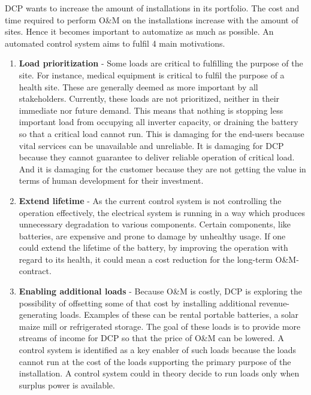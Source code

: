 DCP wants to increase the amount of installations in its portfolio. The cost and time required to perform O\&M on the installations increase with the amount of sites. Hence it becomes important to automatize as much as possible. An automated control system aims to fulfil 4 main motivations.\\

\begin{enumerate}
    \item \textbf{Load prioritization}  -    Some loads are critical to fulfilling the purpose of the site. For instance, medical equipment is critical to fulfil the purpose of a health site. These are generally deemed as more important by all stakeholders. Currently, these loads are not prioritized, neither in their immediate nor future demand. This means that nothing is stopping less important load from occupying all inverter capacity, or draining the battery so that a critical load cannot run. This is damaging for the end-users because vital services can be unavailable and unreliable. It is damaging for DCP because they cannot guarantee to deliver reliable operation of critical load. And it is damaging for the customer because they are not getting the value in terms of human development for their investment.
    \item \textbf{Extend lifetime}  -   As the current control system is not controlling the operation effectively, the electrical system is running in a way which produces unnecessary degradation to various components. Certain components, like batteries, are expensive and prone to damage by unhealthy usage. If one could extend the lifetime of the battery, by improving the operation with regard to its health, it could mean a cost reduction for the long-term O\&M-contract.
    \item \textbf{Enabling additional loads}    -   Because O\&M is costly, DCP is exploring the possibility of offsetting some of that cost by installing additional revenue-generating loads. Examples of these can be rental portable batteries, a solar maize mill or refrigerated storage. The goal of these loads is to provide more streams of income for DCP so that the price of O\&M can be lowered. A control system is identified as a key enabler of such loads because the loads cannot run at the cost of the loads supporting the primary purpose of the installation. A control system could in theory decide to run loads only when surplus power is available.

\end{enumerate}
